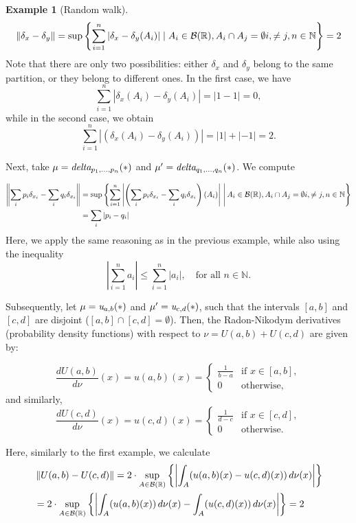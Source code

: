 \documentclass[10pt,a4paper]{amsart}
\theoremstyle{definition}
\theoremstyle{definition}
\newtheorem{example}[definition]{Example}
\theoremstyle{definition}
\theoremstyle{definition}
\theoremstyle{definition}
\theoremstyle{definition}
\begin{document}
\begin{example}[Random walk]
    \begin{align*}
      \left\lVert \delta_x - \delta_y \right\rVert = \sup \left\{ \sum_{i=1}^{n} |\delta_x - \delta_y (A_i)| \mid A_i \in \mathcal{B}(\mathbb{R}), A_i \cap A_j = \emptyset i,  \neq j, n \in \mathbb{N}  \right\} = 2
    \end{align*}
    Note that there are only two possibilities: either \(\delta_x\) and \(\delta_y\) belong to the same partition, or they belong to different ones. In the first case, we have
    \[
    \sum_{i=1}^{n} \left| \delta_x(A_i) - \delta_y(A_i) \right| = |1 - 1| = 0,
    \]
    while in the second case, we obtain
    \[
    \sum_{i=1}^{n} \left| \left( \delta_x(A_i) - \delta_y(A_i) \right) \right| = |1| + |-1| = 2.
    \]
    
    Next, take $\mu=\emph{delta}_{p_1, \ldots, p_n}(*)$ and  $\mu'=\emph{delta}_{q_1, \ldots, q_n}(*)$. We compute

    \begin{align*}
      \left\lVert \sum_i p_i \delta_{x_i} - \sum_i q_i \delta_{x_i} \right\rVert &
      = \sup \left\{ \sum_{i=1}^{n} \left\lvert \left(\sum_i p_i \delta_{x_i} - \sum_i q_i \delta_{x_i} \right) (A_i) \right\rvert \,\Bigg| \, A_i \in \mathcal{B}(\mathbb{R}), A_i \cap A_j = \emptyset i,  \neq j, n \in \mathbb{N}  \right\} \\
      & = \sum_i |p_i-q_i|
    \end{align*}
    Here, we apply the same reasoning as in the previous example, while also using the inequality
\[
\left| \sum_{i=1}^{n} a_i \right| \leq \sum_{i=1}^{n} |a_i|, \quad \text{for all } n \in \mathbb{N}.
\]

Subsequently, let $\mu =\emph{u}_{a,b}(*)$ and  $\mu'=\emph{u}_{c,d}(*)$, such that the intervals $[a,b]$ and $[c,d]$ are disjoint ($[a, b] \cap [c, d] = \emptyset$). Then, the Radon-Nikodym derivatives (probability density functions) with respect to \( \nu = U(a, b) + U(c, d) \) are given by:

\[
\frac{dU(a, b)}{d\nu}(x) = u(a,b)(x) = 
\begin{cases} 
\frac{1}{b - a} & \text{if } x \in [a, b], \\ 
0 & \text{otherwise},
\end{cases}
\]
and similarly,
\[
\frac{dU(c, d)}{d\nu}(x) = u(c,d)(x) = 
\begin{cases} 
\frac{1}{d - c} & \text{if } x \in [c, d], \\ 
0 & \text{otherwise}.
\end{cases}
\]

Here, similarly to the first example, we calculate
\begin{align*}
  &\left\lVert U(a,b)-U(c,d) \right\rVert = 2 \cdot \sup_{A \in \mathcal{B}(\mathbb{R})}  \left\{ \left\vert\int_A (u(a,b)(x)- u(c,d)(x)) \, d \nu(x) \right\vert \right\} \\
  & = 2 \cdot \sup_{A \in \mathcal{B}(\mathbb{R})}  \left\{ \left\vert\int_A (u(a,b)(x)) \, d \nu(x)  - \int_A (u(c,d)(x)) \,  d\nu(x) \right\vert \right\} = 2
\end{align*}


\end{example}
\end{document}
